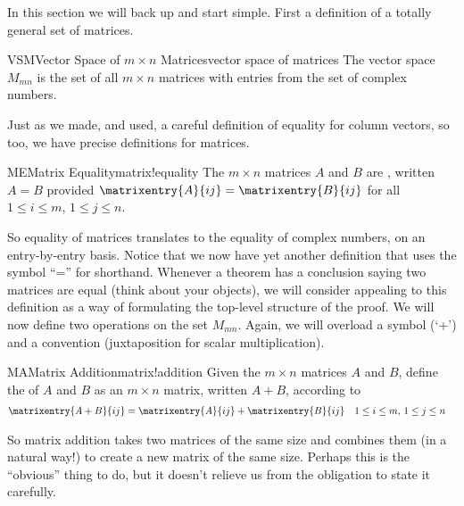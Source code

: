 %
In this section we will back up and start simple.  First a definition of a totally general set of matrices.
%
\begin{definition}{VSM}{Vector Space of $m\times n$ Matrices}{vector space of matrices}
The vector space $M_{mn}$ is the set of all $m\times n$ matrices with entries from the set of complex numbers.
\end{definition}
%
%
Just as we made, and used, a careful definition of equality for column vectors, so too, we have precise definitions for matrices.
%
\begin{definition}{ME}{Matrix Equality}{matrix!equality}
The $m\times n$ matrices $A$ and $B$ are , written $A=B$ provided $\matrixentry{A}{ij}=\matrixentry{B}{ij}$ for all $1\leq i\leq m$, $1\leq j\leq n$.
\end{definition}
%
So equality of matrices translates to the equality of complex numbers, on an entry-by-entry basis.  Notice that we now have yet another definition that uses the symbol ``='' for shorthand.  Whenever a theorem has a conclusion saying two matrices are equal (think about your objects), we will consider appealing to this definition as a way of formulating the top-level structure of the proof.
%
We will now define two operations on the set $M_{mn}$.  Again, we will overload a symbol (`+') and a convention (juxtaposition for scalar multiplication).
%
\begin{definition}{MA}{Matrix Addition}{matrix!addition}
Given the $m\times n$ matrices  $A$ and $B$, define the  of $A$ and $B$ as an $m\times n$ matrix, written $A+B$, according to
%
\begin{align*}
\matrixentry{A+B}{ij}&=\matrixentry{A}{ij}+\matrixentry{B}{ij}
&&1\leq i\leq m,\,1\leq j\leq n
\end{align*}
%
\end{definition}
%
So matrix addition takes two matrices of the same size and combines them (in a natural way!) to create a new matrix of the same size.  Perhaps this is the ``obvious'' thing to do, but it doesn't relieve us from the obligation to state it carefully.

